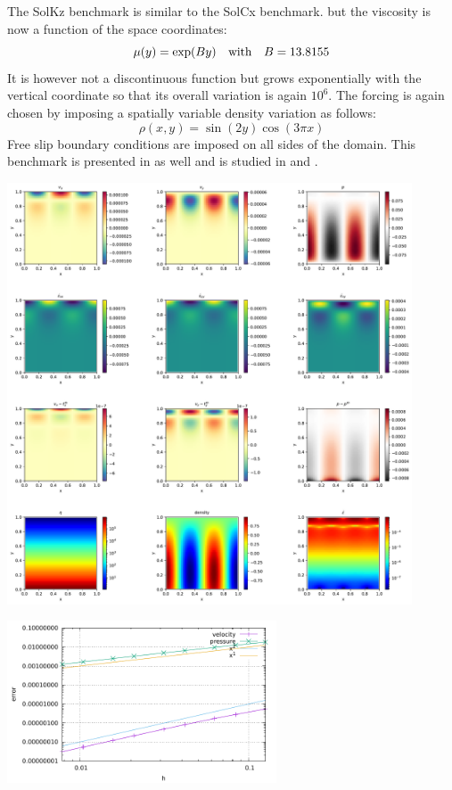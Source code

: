 
The SolKz benchmark \cite{repa87} is similar to the SolCx benchmark.
but the viscosity is now a function of the space coordinates: 
\begin{equation}
\mu(y)=\exp(By) \quad {\rm with} \quad B=13.8155
\end{equation}
It is however not a discontinuous function but grows exponentially with the vertical coordinate so that its overall variation is again $10^6$. 
The forcing is again chosen by imposing a spatially variable density variation as follows:
\begin{equation}
\rho(x,y)=\sin(2y) \cos(3\pi x)
\end{equation}
Free slip boundary conditions are imposed on all sides of the domain.
This benchmark is presented in \cite{zhon96} as well and is studied in \cite{dumg11} and \cite{gemd13}.

\includegraphics[width=12cm]{python_codes/fieldstone_solkz/solution.pdf}

\includegraphics[width=8cm]{python_codes/fieldstone_solkz/errors.pdf}
